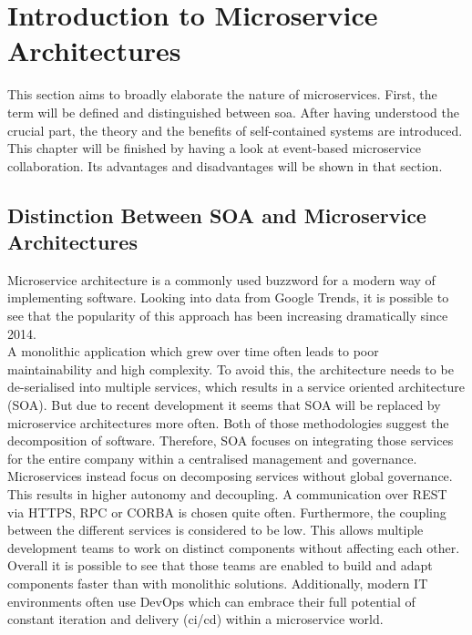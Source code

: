 \section{Introduction to Microservice  Architectures}
\label{sec:techKnowHow}
This section aims to broadly elaborate the nature of microservices. First, the term will be defined and distinguished between \acrfull{soa}. After having understood the crucial part, the theory and the benefits of self-contained systems are introduced. This chapter will be finished by having a look at event-based microservice collaboration. Its advantages and disadvantages will be shown in that section. 

\subsection{Distinction Between SOA and Microservice Architectures}
Microservice architecture is a commonly used buzzword for a modern way of implementing software. Looking into data from Google Trends, it is possible to see that the popularity of this approach has been increasing dramatically since 2014. \cite{microservices}\newline
\\
A monolithic application which grew over time often leads to poor maintainability and high complexity. To avoid this, the architecture needs to be de-serialised into multiple services, which results in a service oriented architecture (SOA). But due to recent development it seems that SOA will be replaced by microservice architectures more often.\cite{mircorVSsoa}\newline
Both of those methodologies suggest the decomposition of software. Therefore, SOA focuses on integrating those services for the entire company within a centralised management and governance. Microservices instead focus on decomposing services without global governance. This results in higher autonomy and decoupling. \cite{mircorVSsoa} A communication over REST via HTTPS, RPC or CORBA is chosen quite often.\newline
Furthermore, the coupling between the different services is considered to be low. This allows multiple development teams to work on distinct components without affecting each other. Overall it is possible to see that those teams are enabled to build and adapt components faster than with monolithic solutions. Additionally,  modern IT environments often use DevOps which can embrace their full potential of constant iteration and delivery (\acrshort{ci/cd}) within a microservice  world. \cite{redHatMicroservices}\newline
